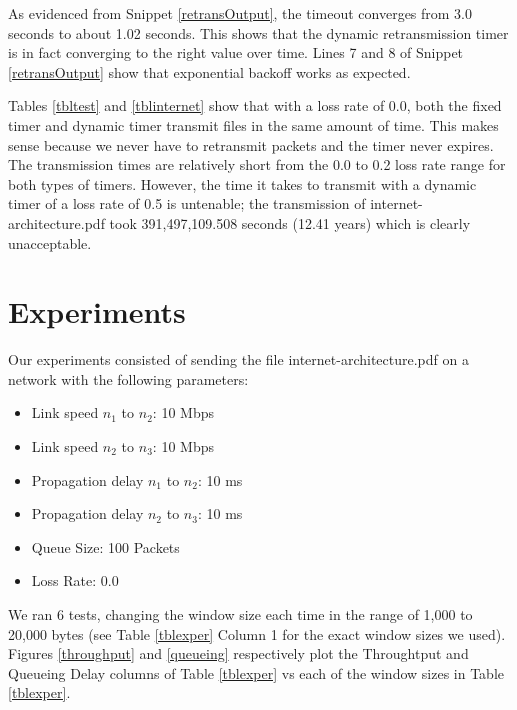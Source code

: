 \documentclass[11pt]{article}
\begin{document}
As evidenced from Snippet \ref{retransOutput}, the timeout converges from 3.0 seconds to about 1.02 seconds. This shows that the dynamic retransmission timer is in fact converging to the right value over time. Lines 7 and 8 of Snippet \ref{retransOutput} show that exponential backoff works as expected.

Tables \ref{tbltest} and \ref{tblinternet} show that with a loss rate of 0.0, both the fixed timer and dynamic timer transmit files in the same amount of time. This makes sense because we never have to retransmit packets and the timer never expires. The transmission times are relatively short from the 0.0 to 0.2 loss rate range for both types of timers. However, the time it takes to transmit with a dynamic timer of a loss rate of 0.5 is untenable; the transmission of internet-architecture.pdf took 391,497,109.508 seconds (12.41 years) which is clearly unacceptable.

\section{Experiments}

Our experiments consisted of sending the file internet-architecture.pdf on a network with the following parameters:

\begin{itemize}
\item Link speed $n_1$ to $n_2$: 10 Mbps
\item Link speed $n_2$ to $n_3$: 10 Mbps
\item Propagation delay $n_1$ to $n_2$: 10 ms
\item Propagation delay $n_2$ to $n_3$: 10 ms
\item Queue Size: 100 Packets
\item Loss Rate: 0.0
\end{itemize}

We ran 6 tests, changing the window size each time in the range of 1,000 to 20,000 bytes (see Table \ref{tblexper} Column 1 for the exact window sizes we used). Figures \ref{throughput} and \ref{queueing} respectively plot the Throughtput and Queueing Delay columns of Table \ref{tblexper} vs each of the window sizes in Table \ref{tblexper}.
\end{document}
